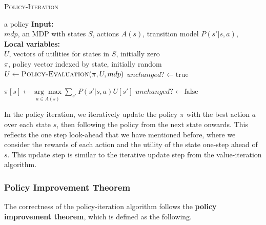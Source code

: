 \documentclass[11pt]{article}
\begin{document}
\begin{algorithm}[!htb]
\caption{\textsc{Policy-Iteration}}
\begin{algorithmic}[1]
 \Return a policy
\State \textbf{Input:} \\
\hspace*{\algorithmicindent} \hspace*{\algorithmicindent} $mdp$, an MDP with states $S$, actions $A(s)$, transition model $P(s' | s, a)$,\\ 

\State \textbf{Local variables:} \\
\hspace*{\algorithmicindent} \hspace*{\algorithmicindent} $U$, vectors of utilities for states in $S$, initially zero\\
\hspace*{\algorithmicindent} \hspace*{\algorithmicindent} $\pi$, policy 
vector indexed by state, initially random\\

\Repeat
\State $U \leftarrow \textsc{Policy-Evaluation}(\pi, U, mdp)$
\State $unchanged? \leftarrow \text{true}$

\State $\pi[s] \leftarrow \underset{a \in A(s)}{\arg\max} \sum_{s'} P(s' | s, a) U[s']$
\State $unchanged? \leftarrow \text{false}$
\EndIf
\EndFor


\EndProcedure
\end{algorithmic}
\end{algorithm}

In the policy iteration, we iteratively update the policy $\pi$ with the best action $a$ over each state $s$, then following the policy from the next state onwards. This reflects the one step look-ahead that we have mentioned before, where we consider the rewards of each action and the utility of the state one-step ahead of $s$. This update step is similar to the iterative update step from the value-iteration algorithm.

\subsubsection{Policy Improvement Theorem}

The correctness of the policy-iteration algorithm follows the \textbf{policy improvement theorem}, which is defined as the following.
\end{document}
